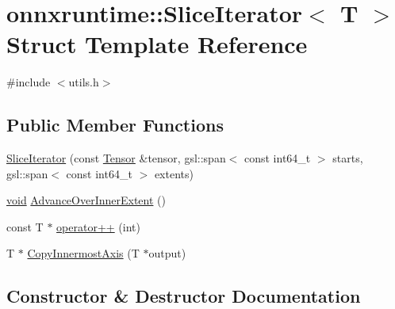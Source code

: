 \hypertarget{structonnxruntime_1_1SliceIterator}{}\section{onnxruntime\+:\+:Slice\+Iterator$<$ T $>$ Struct Template Reference}
\label{structonnxruntime_1_1SliceIterator}


{\ttfamily \#include $<$utils.\+h$>$}

\subsection*{Public Member Functions}
\begin{DoxyCompactItemize}
\item 
\mbox{\hyperlink{structonnxruntime_1_1SliceIterator_aa6f3ea21d6235021d245744d1983718b}{Slice\+Iterator}} (const \mbox{\hyperlink{classonnxruntime_1_1Tensor}{Tensor}} \&tensor, gsl\+::span$<$ const int64\+\_\+t $>$ starts, gsl\+::span$<$ const int64\+\_\+t $>$ extents)
\item 
\mbox{\hyperlink{mlasi_8h_a88f941d423cb2a819b70a1358982b1a6}{void}} \mbox{\hyperlink{structonnxruntime_1_1SliceIterator_af23a82ce0ef66164c5b40f82d650ef0f}{Advance\+Over\+Inner\+Extent}} ()
\item 
const T $\ast$ \mbox{\hyperlink{structonnxruntime_1_1SliceIterator_af66a075050c630b9cc9d3da9ba7987d2}{operator++}} (int)
\item 
T $\ast$ \mbox{\hyperlink{structonnxruntime_1_1SliceIterator_a5f7af2187fb7a2e5431bb0b542b0e187}{Copy\+Innermost\+Axis}} (T $\ast$output)
\end{DoxyCompactItemize}


\subsection{Constructor \& Destructor Documentation}
\mbox{\label{structonnxruntime_1_1SliceIterator_aa6f3ea21d6235021d245744d1983718b}} 
